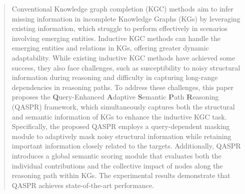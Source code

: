\documentclass[sigconf]{acmart}
\begin{document}
\begin{abstract}
Conventional Knowledge graph completion (KGC) methods aim to infer missing information in incomplete Knowledge Graphs (KGs) by leveraging existing information, which struggle to perform effectively in scenarios involving emerging entities.
Inductive KGC methods can handle the emerging entities and relations in KGs, offering greater dynamic adaptability. While existing inductive KGC methods have achieved some success, they also face challenges, such as susceptibility to noisy structural information during reasoning and difficulty in capturing long-range dependencies in reasoning paths. To address these challenges, this paper proposes the \textbf{Q}uery-Enhanced \textbf{A}daptive \textbf{S}emantic \textbf{P}ath \textbf{R}easoning (QASPR) framework, which simultaneously captures both the structural and semantic information of KGs to enhance the inductive KGC task. Specifically, the proposed QASPR employs a query-dependent masking module to adaptively mask noisy structural information while retaining important information closely related to the targets. Additionally, QASPR introduces a global semantic scoring module that evaluates both the individual contributions and the collective impact of nodes along the reasoning path within KGs. %
The experimental results demonstrate that QASPR achieves state-of-the-art performance.

\end{abstract}
\end{document}

